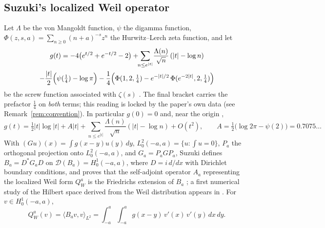 \documentclass[11pt,a4paper]{article}
\theoremstyle{remark}
\newcommand{\Lam}{\Lambda}
\begin{document}
\subsection{Suzuki's localized Weil operator}
Let $\Lam$ be the von Mangoldt function,
$\psi$ the digamma function, $\Phi(z,s,a)=\sum_{n\ge0}(n+a)^{-s}z^n$ the
Hurwitz--Lerch zeta function, and let
\begin{multline}\label{eq:screw}
g(t)=-4\bigl(e^{t/2}+e^{-t/2}-2\bigr)
+\!\!\sum_{n\le e^{|t|}}\!\frac{\Lam(n)}{\sqrt n}\,(|t|-\log n)\\
-\frac{|t|}{2}\Bigl(\psi(\tfrac14)-\log\pi\Bigr)
-\frac14\Bigl(\Phi(1,2,\tfrac14)-e^{-|t|/2}\,\Phi(e^{-2|t|},2,\tfrac14)\Bigr)
\end{multline}
be the screw function associated with $\zeta(s)$
\cite[eq.~(1.3)]{Suz26}.  The final bracket carries the prefactor
$\tfrac14$ on \emph{both} terms; this reading is locked by the paper's
own data (see Remark~\ref{rem:convention}).  In particular $g(0)=0$ and,
near the origin \cite[Sec.~2.2]{Suz26},
\begin{equation}\label{eq:origin}
g(t)=\tfrac12|t|\log|t|+A|t|
+\!\!\sum_{n\le e^{|t|}}\!\frac{\Lam(n)}{\sqrt n}(|t|-\log n)+O(t^2),
\qquad A=\tfrac12\bigl(\log 2\pi-\psi(2)\bigr)=0.7075\ldots
\end{equation}
With $(Gu)(x)=\int g(x-y)u(y)\,dy$, $L^2_0(-a,a)=\{u:\int u=0\}$, $P_a$
the orthogonal projection onto $L^2_0(-a,a)$, and $G_a=P_aGP_a$, Suzuki
defines $B_a=D^*G_aD$ on $\mathcal D(B_a)=H^1_0(-a,a)$, where
$D=i\,d/dx$ with Dirichlet boundary conditions, and proves that the
self-adjoint operator $A_a$ representing the localized Weil form
$Q^a_W$ is the Friedrichs extension of $B_a$
\cite[Thm.~1.1]{Suz26}; a first numerical study of the Hilbert space
derived from the Weil distribution appears in \cite{Suz26b}.  For
$v\in H^1_0(-a,a)$,
\begin{equation}\label{eq:form}
Q^a_W(v)=\langle B_av,v\rangle_{L^2}
=\int_{-a}^{a}\!\!\int_{-a}^{a} g(x-y)\,v'(x)\,v'(y)\,dx\,dy .
\end{equation}
\end{document}
